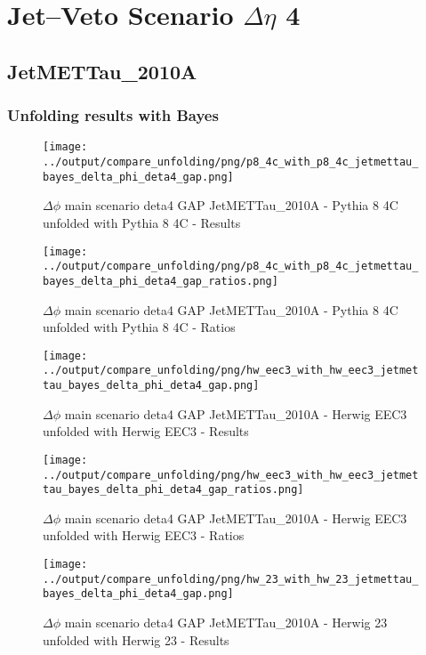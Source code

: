 \documentclass[11pt]{book}
\begin{document}
\newpage
\chapter{Jet--Veto Scenario $\Delta\eta$ 4}
\section{JetMETTau\_2010A}
\subsection{Unfolding results with Bayes}

\begin{figure}[ht]
\centering
\texttt{[image: ../output/compare\_unfolding/png/p8\_4c\_with\_p8\_4c\_jetmettau\_bayes\_delta\_phi\_deta4\_gap.png]}
\caption{$\Delta\phi$ main scenario deta4 GAP JetMETTau\_2010A - Pythia 8 4C unfolded with Pythia 8 4C - Results}
\label{p8_p8_jetmettau_bayes_delta_phi_deta4_gap_a}
\end{figure}

\begin{figure}[ht]
\centering
\texttt{[image: ../output/compare\_unfolding/png/p8\_4c\_with\_p8\_4c\_jetmettau\_bayes\_delta\_phi\_deta4\_gap\_ratios.png]}
\caption{$\Delta\phi$ main scenario deta4 GAP JetMETTau\_2010A - Pythia 8 4C unfolded with Pythia 8 4C - Ratios}
\label{p8_p8_jetmettau_bayes_delta_phi_deta4_gap_b}
\end{figure}

\begin{figure}[ht]
\centering
\texttt{[image: ../output/compare\_unfolding/png/hw\_eec3\_with\_hw\_eec3\_jetmettau\_bayes\_delta\_phi\_deta4\_gap.png]}
\caption{$\Delta\phi$ main scenario deta4 GAP JetMETTau\_2010A - Herwig EEC3 unfolded with Herwig EEC3 - Results}
\label{hw_eec3_hw_eec3_jetmettau_bayes_delta_phi_deta4_gap_a}
\end{figure}

\begin{figure}[ht]
\centering
\texttt{[image: ../output/compare\_unfolding/png/hw\_eec3\_with\_hw\_eec3\_jetmettau\_bayes\_delta\_phi\_deta4\_gap\_ratios.png]}
\caption{$\Delta\phi$ main scenario deta4 GAP JetMETTau\_2010A - Herwig EEC3 unfolded with Herwig EEC3 - Ratios}
\label{hw_eec3_hw_eec3_jetmettau_bayes_delta_phi_deta4_gap_b}
\end{figure}

\begin{figure}[ht]
\centering
\texttt{[image: ../output/compare\_unfolding/png/hw\_23\_with\_hw\_23\_jetmettau\_bayes\_delta\_phi\_deta4\_gap.png]}
\caption{$\Delta\phi$ main scenario deta4 GAP JetMETTau\_2010A - Herwig 23 unfolded with Herwig 23 - Results}
\label{hw_23_hw_23_jetmettau_bayes_delta_phi_deta4_gap_a}
\end{figure}
\end{document}
